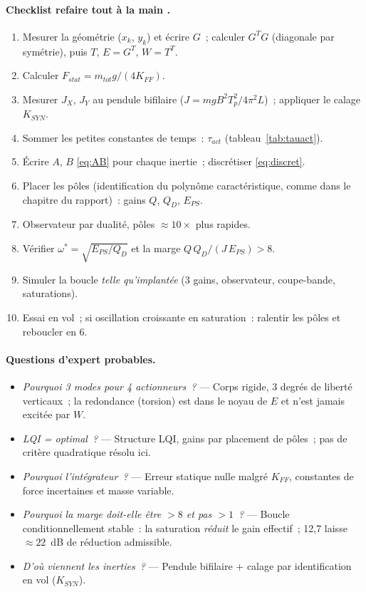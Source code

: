 \documentclass[a4paper,11pt]{article}
\begin{document}
\paragraph{Checklist \og refaire tout à la main \fg.}
\begin{enumerate}
    \item Mesurer la géométrie ($x_k$, $y_k$) et écrire $G$~;
          calculer $G^TG$ (diagonale par symétrie), puis $T$, $E = G^T$,
          $W = T^T$.
    \item Calculer $F_{stat} = m_{tot}g/(4K_{FF})$.
    \item Mesurer $J_X$, $J_Y$ au pendule bifilaire
          ($J = mgB^2T_p^2/4\pi^2L$)~; appliquer le calage $K_{SYN}$.
    \item Sommer les petites constantes de temps~: $\tau_{act}$
          (tableau~\ref{tab:tauact}).
    \item Écrire $A$, $B$ \eqref{eq:AB} pour chaque inertie~; discrétiser
          \eqref{eq:discret}.
    \item Placer les pôles (identification du polynôme caractéristique,
          comme dans le chapitre du rapport)~: gains $Q$, $Q_D$, $E_{PS}$.
    \item Observateur par dualité, pôles $\approx 10\times$ plus rapides.
    \item Vérifier $\omega^* = \sqrt{E_{PS}/Q_D}$ et la marge
          $Q\,Q_D/(J\,E_{PS}) > 8$.
    \item Simuler la boucle \emph{telle qu'implantée} (3 gains, observateur,
          coupe-bande, saturations).
    \item Essai en vol~; si oscillation croissante en saturation~: ralentir
          les pôles et reboucler en 6.
\end{enumerate}

\paragraph{Questions d'expert probables.}
\begin{itemize}
    \item \emph{Pourquoi 3 modes pour 4 actionneurs~?} --- Corps rigide, 3
          degrés de liberté verticaux~; la redondance (torsion) est dans le
          noyau de $E$ et n'est jamais excitée par $W$.
    \item \emph{LQI = optimal~?} --- Structure LQI, gains par placement de
          pôles~; pas de critère quadratique résolu ici.
    \item \emph{Pourquoi l'intégrateur~?} --- Erreur statique nulle malgré
          $K_{FF}$, constantes de force incertaines et masse variable.
    \item \emph{Pourquoi la marge doit-elle être $>8$ et pas $>1$~?} ---
          Boucle conditionnellement stable~: la saturation \emph{réduit} le
          gain effectif~; 12{,}7 laisse $\approx 22$~dB de réduction admissible.
    \item \emph{D'où viennent les inerties~?} --- Pendule bifilaire + calage
          par identification en vol ($K_{SYN}$).
\end{itemize}
\end{document}
